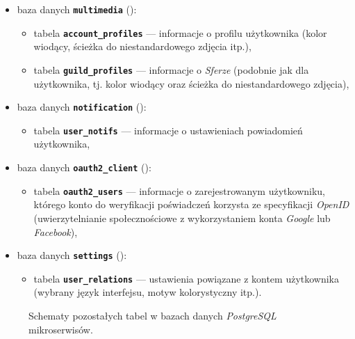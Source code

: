 \begin{itemize}
  \item baza danych \textbf{\texttt{multimedia}} ():
        \begin{itemize}
          \item tabela \textbf{\texttt{account\_profiles}} — informacje o profilu użytkownika (kolor wiodący, ścieżka do
                niestandardowego zdjęcia itp.),
          \item tabela \textbf{\texttt{guild\_profiles}} — informacje o \textit{Sferze} (podobnie jak dla użytkownika,
                tj. kolor wiodący oraz ścieżka do niestandardowego zdjęcia),
        \end{itemize}
  \item baza danych \textbf{\texttt{notification}} ():
        \begin{itemize}
          \item	tabela \textbf{\texttt{user\_notifs}} — informacje o ustawieniach powiadomień użytkownika,
        \end{itemize}
  \item baza danych \textbf{\texttt{oauth2\_client}} ():
        \begin{itemize}
          \item tabela \textbf{\texttt{oauth2\_users}} — informacje o zarejestrowanym użytkowniku, którego konto do
                weryfikacji poświadczeń korzysta ze specyfikacji \textit{OpenID} (uwierzytelnianie społecznościowe z
                wykorzystaniem konta \textit{Google} lub \textit{Facebook}),
        \end{itemize}
  \item baza danych \textbf{\texttt{settings}} ():
        \begin{itemize}
          \item tabela \textbf{\texttt{user\_relations}} — ustawienia powiązane z kontem użytkownika (wybrany język
                interfejsu, motyw kolorystyczny itp.).
        \end{itemize}
\end{itemize}
%
\begin{figure}[H]
  \centering
  \caption{Schematy pozostałych tabel w bazach danych \textit{PostgreSQL} mikroserwisów.}
  \label{fig:pgsql-second-model}
\end{figure}


